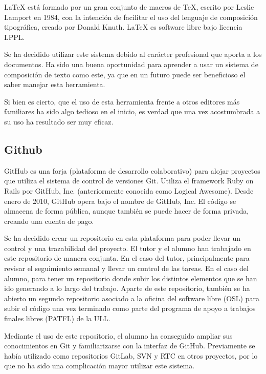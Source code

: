 LaTeX está formado por un gran conjunto de macros de TeX, escrito por Leslie Lamport en 1984, con la intención de facilitar el uso del lenguaje de composición tipográfica, creado por Donald Knuth. LaTeX es software libre bajo licencia LPPL.

Se ha decidido utilizar este sistema debido al carácter profesional que aporta a los documentos. Ha sido una buena oportunidad para aprender a usar un sistema de composición de texto como este, ya que en un futuro puede ser beneficioso el saber manejar esta herramienta. 

Si bien es cierto, que el uso de esta herramienta frente a otros editores más familiares ha sido algo tedioso en el inicio, es verdad que una vez acostumbrada a su uso ha resultado ser muy eficaz.

\vskip 0.5in

\subsection{Github}

GitHub \cite{URL::Github} es una forja (plataforma de desarrollo colaborativo) para alojar proyectos que utiliza el sistema de control de versiones Git. Utiliza el framework Ruby on Rails por GitHub, Inc.  (anteriormente conocida como Logical Awesome). Desde enero de 2010, GitHub opera bajo el nombre de GitHub, Inc. El código se almacena de forma pública, aunque también se puede hacer de forma privada, creando una cuenta de pago.

Se ha decidido crear un repositorio en esta plataforma para poder llevar un control y una trazabilidad del proyecto. El tutor y el alumno han trabajado en este repositorio de manera conjunta. En el caso del tutor, principalmente para revisar el seguimiento semanal y llevar un control de las tareas. En el caso del alumno, para tener un repositorio donde subir los distintos elementos que se han ido generando a lo largo del trabajo. Aparte de este repositorio, también se ha abierto un segundo repositorio \cite{URL::repositorioAplicacion} asociado a la oficina del software libre (OSL) para subir el código una vez terminado como parte del programa de apoyo a trabajos finales libres (PATFL) \cite{URL::PATFL} de la ULL.

Mediante el uso de este repositorio, el alumno ha conseguido ampliar sus conocimientos en Git y familiarizarse con la interfaz de GitHub. Previamente se había utilizado como repositorios GitLab, SVN y RTC en otros proyectos, por lo que no ha sido una complicación mayor utilizar este sistema.

